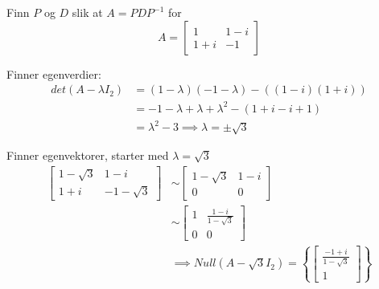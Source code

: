 \documentclass[11pt, a4paper, norsk]{NTNUoving}
\begin{document}
    \begin{oppgave}
        Finn $P$ og $D$ slik at $A = PDP^{-1}$ for $$A = \begin{bmatrix}
            1 & 1-i \\
            1+i & -1
        \end{bmatrix}$$

        Finner egenverdier:
        \begin{align*}
            det(A - \lambda I_2) &= (1-\lambda)(-1-\lambda) - ((1-i)(1+i))
            \\
                                 &= -1-\lambda+\lambda+\lambda^2-(1+i-i+1)
                                 \\
                                 &= \lambda^2 - 3 \implies \lambda = \pm \sqrt{3}
        \end{align*}

        Finner egenvektorer, starter med $\lambda = \sqrt{3}$
        \begin{align*}
            \begin{bmatrix}
                1-\sqrt{3} & 1-i \\
                1+i & -1-\sqrt{3}
            \end{bmatrix} &\sim \begin{bmatrix}
            1-\sqrt{3} & 1-i \\
            0 & 0
            \end{bmatrix}
            \\
            &\sim \begin{bmatrix}
                1 & \frac{1-i}{1-\sqrt{3}} \\
                0 & 0
            \end{bmatrix}
            \\
            &\implies Null(A - \sqrt{3}I_2) = \left\{\begin{bmatrix}
                    \frac{-1+i}{1-\sqrt{3}} \\
                    1
            \end{bmatrix}\right\}
        \end{align*}
        

\end{oppgave}
\end{document}
